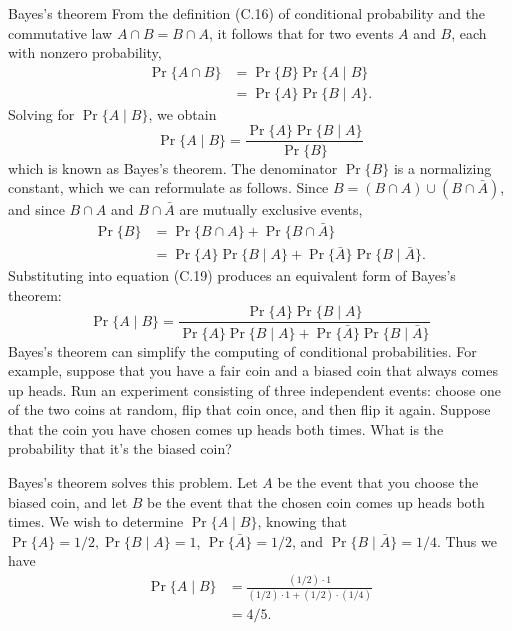 \documentclass[lang=cn,newtx,10pt,scheme=chinese]{elegantbook}
\begin{document}
Bayes's theorem
From the definition (C.16) of conditional probability and the commutative law $A \cap B=B \cap A$, it follows that for two events $A$ and $B$, each with nonzero probability,
$$
\begin{aligned}
\operatorname{Pr}\{A \cap B\} & =\operatorname{Pr}\{B\} \operatorname{Pr}\{A \mid B\} \\
& =\operatorname{Pr}\{A\} \operatorname{Pr}\{B \mid A\} .
\end{aligned}
$$
Solving for $\operatorname{Pr}\{A \mid B\}$, we obtain
$$
\operatorname{Pr}\{A \mid B\}=\frac{\operatorname{Pr}\{A\} \operatorname{Pr}\{B \mid A\}}{\operatorname{Pr}\{B\}}
$$
which is known as Bayes's theorem. The denominator $\operatorname{Pr}\{B\}$ is a normalizing constant, which we can reformulate as follows. Since $B=(B \cap A) \cup(B \cap \bar{A})$, and since $B \cap A$ and $B \cap \bar{A}$ are mutually exclusive events,
$$
\begin{aligned}
\operatorname{Pr}\{B\} & =\operatorname{Pr}\{B \cap A\}+\operatorname{Pr}\{B \cap \bar{A}\} \\
& =\operatorname{Pr}\{A\} \operatorname{Pr}\{B \mid A\}+\operatorname{Pr}\{\bar{A}\} \operatorname{Pr}\{B \mid \bar{A}\} .
\end{aligned}
$$
Substituting into equation (C.19) produces an equivalent form of Bayes's theorem:
$$
\operatorname{Pr}\{A \mid B\}=\frac{\operatorname{Pr}\{A\} \operatorname{Pr}\{B \mid A\}}{\operatorname{Pr}\{A\} \operatorname{Pr}\{B \mid A\}+\operatorname{Pr}\{\bar{A}\} \operatorname{Pr}\{B \mid \bar{A}\}}
$$
Bayes's theorem can simplify the computing of conditional probabilities. For example, suppose that you have a fair coin and a biased coin that always comes up heads. Run an experiment consisting of three independent events: choose one of the two coins at random, flip that coin once, and then flip it again. Suppose that the coin you have chosen comes up heads both times. What is the probability that it's the biased coin?

Bayes's theorem solves this problem. Let $A$ be the event that you choose the biased coin, and let $B$ be the event that the chosen coin comes up heads both times. We wish to determine $\operatorname{Pr}\{A \mid B\}$, knowing that $\operatorname{Pr}\{A\}=1 / 2, \operatorname{Pr}\{B \mid A\}=1$, $\operatorname{Pr}\{\bar{A}\}=1 / 2$, and $\operatorname{Pr}\{B \mid \bar{A}\}=1 / 4$. Thus we have
$$
\begin{aligned}
\operatorname{Pr}\{A \mid B\} & =\frac{(1 / 2) \cdot 1}{(1 / 2) \cdot 1+(1 / 2) \cdot(1 / 4)} \\
& =4 / 5 .
\end{aligned}
$$
\end{document}
